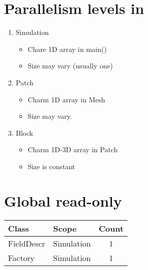 \documentclass{article}[12pt]
\begin{document}

\tableofcontents

\section{Parallelism levels in \enzop}

\begin{enumerate}
\item Simulation  
  \begin{itemize}
  \item Chare 1D array in main()
  \item Size may vary (usually one)
  \end{itemize}
\item Patch  
  \begin{itemize}
  \item Charm 1D array in Mesh
  \item Size may vary.
  \end{itemize}
\item Block
  \begin{itemize}
  \item Charm 1D-3D array in Patch
  \item Size is constant
  \end{itemize}
\end{enumerate}

\section{Global read-only}
\begin{tabular}{llc}
  Class      &   Scope    &  Count \\ \hline
  FieldDescr & Simulation &     1 \\
  Factory    & Simulation &     1 
\end{tabular}
\end{document}
